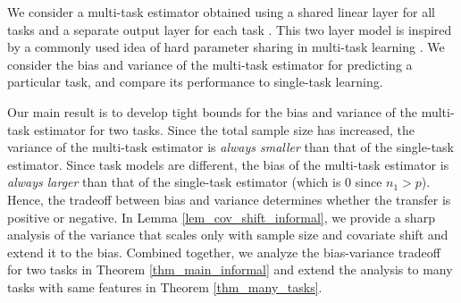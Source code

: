 
We consider a multi-task estimator obtained using a shared linear layer for all tasks and a separate output layer for each task \cite{WZR20}.
This two layer model is inspired by a commonly used idea of hard parameter sharing in multi-task learning \cite{R17,MTDNN19}.
We consider the bias and variance of the multi-task estimator for predicting a particular task, and compare its performance to single-task learning.

Our main result is to develop tight bounds for the bias and variance of the multi-task estimator for two tasks.
Since the total sample size has increased, the variance of the multi-task estimator is \textit{always smaller} than that of the single-task estimator.
Since task models are different, the bias of the multi-task estimator is \textit{always larger} than that of the single-task estimator (which is $0$ since $n_1 > p$).
Hence, the tradeoff between bias and variance determines whether the transfer is positive or negative.
In Lemma \ref{lem_cov_shift_informal}, we provide a sharp analysis of the variance that scales only with sample size and covariate shift and extend it to the bias.
Combined together, we analyze the bias-variance tradeoff for two tasks in Theorem \ref{thm_main_informal} and extend the analysis to many tasks with same features in Theorem \ref{thm_many_tasks}.

